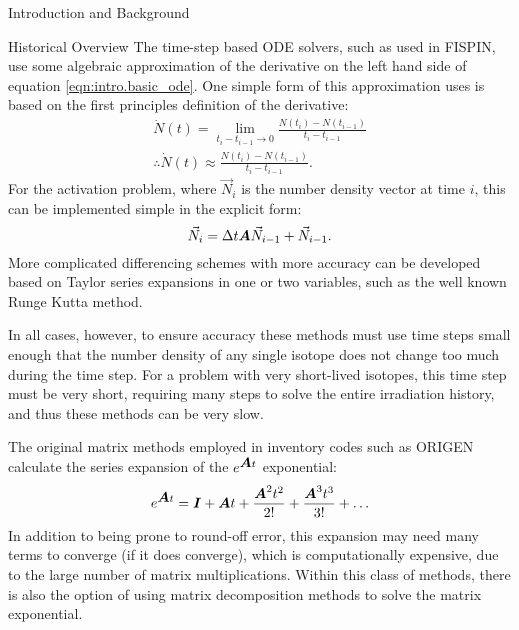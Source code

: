 \begin{chapter}{Introduction and Background}
\begin{section}{Historical Overview}
  The time-step based ODE solvers, such as used in
  FISPIN\cite{FISPIN}, use some algebraic approximation of the
  derivative on the left hand side of equation
  \ref{eqn:intro.basic_ode}.  One simple form of this approximation
  uses is based on the first principles definition of the derivative:
  \begin{equation*}
    \begin{split}
      \dot{N}(t) = \lim_{t_i - t_{i-1} \rightarrow 0} \frac{N(t_i)
        - N(t_{i-1})}{t_i - t_{i-1}}\\
      \therefore \dot{N}(t) \approx \frac{N(t_i)
        - N(t_{i-1})}{t_i - t_{i-1}}.
    \end{split}
  \end{equation*}
  For the activation problem, where $\vec{N}_i$ is the number density
  vector at time $i$, this can be implemented simple in the explicit
  form:
  \begin{equation}
    \label{eqn:intro.time-step}
    \vec{N}_i = \Delta t \mbox{\boldmath $A$}\vec{N}_{i-1} + \vec{N}_{i-1}.
  \end{equation}
  More complicated differencing schemes with more accuracy can be
  developed based on Taylor series expansions in one or two variables,
  such as the well known Runge Kutta method.
  
  In all cases, however, to ensure accuracy these methods must use
  time steps small enough that the number density of any single
  isotope does not change too much during the time step.  For a
  problem with very short-lived isotopes, this time step must be very
  short, requiring many steps to solve the entire irradiation history,
  and thus these methods can be very slow.
  
  The original matrix methods employed in inventory codes such as
  ORIGEN\cite{ORIGEN} calculate the series expansion of the
  $e^{\mbox{\boldmath $A$}t}$ exponential:
  \begin{equation*}
    e^{\mbox{\boldmath $A$}t} = \mbox{\boldmath $I$} + \mbox{\boldmath $A$}t + \frac{\mbox{\boldmath $A$}^2t^2}{2!} +
    \frac{\mbox{\boldmath $A$}^3t^3}{3!} + \ldots
  \end{equation*}
  In addition to being prone to round-off error, this expansion may
  need many terms to converge (if it does converge), which is
  computationally expensive, due to the large number of matrix
  multiplications.  Within this class of methods, there is also the
  option of using matrix decomposition methods to solve the matrix
  exponential.
  

\end{section}
\end{chapter}
